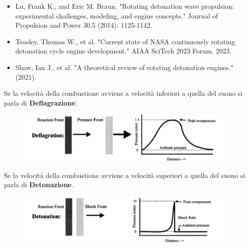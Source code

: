 \begin{frame}
    \maketitle
\end{frame}
\begin{frame}
  \begin{itemize}
    \item   Lu, Frank K., and Eric M. Braun. "Rotating detonation wave propulsion: experimental challenges, modeling, and engine concepts." Journal of Propulsion and Power 30.5 (2014): 1125-1142.
    \item Teasley, Thomas W., et al. "Current state of NASA continuously rotating detonation cycle engine development." AIAA SciTech 2023 Forum. 2023.
    \item Shaw, Ian J., et al. "A theoretical review of rotating detonation engines." (2021).

  \end{itemize}
\end{frame}
\begin{frame}
  Se la velocità della combustione avviene a velocità inferiori a quella del suono si parla di \textbf{Deflagrazione}.
  \begin{figure}
    \includegraphics[scale = 0.4]{deflag_expl.png}
  \end{figure}
\end{frame}
\begin{frame}
Se la velocità della combustione avviene a velocità superiori a quella del suono si parla di \textbf{Detonazione}.
  \begin{figure}
    \includegraphics[scale = 0.4]{detonation_expl.png}
  \end{figure}
\end{frame}
